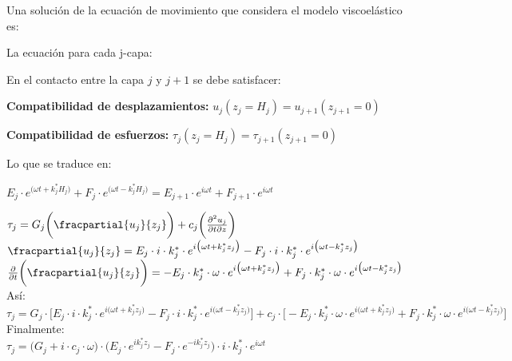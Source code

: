 

Una solución de la ecuación de movimiento que considera el modelo viscoelástico es:


La ecuación para cada j-capa:


En el contacto entre la capa $j$ y $j+1$ se debe satisfacer:

\begin{enumeratebf}
	\item \textbf{Compatibilidad de desplazamientos:} $u_j(z_j=H_j) = u_{j+1}(z_{j+1}=0)$
	\item \textbf{Compatibilidad de esfuerzos:} $\tau_j(z_j=H_j) = \tau_{j+1}(z_{j+1}=0)$
\end{enumeratebf}

Lo que se traduce en:

\begin{enumeratebf}
	\item $E_j\cdot e^{\big(\omega t + k_j^* H_j\big)} + F_j\cdot e^{\big(\omega t - k_j^* H_j\big)} = E_{j+1}\cdot e^{i\omega t} + F_{j+1}\cdot e^{i\omega t}$
	
	\item $\tau_j = G_j\bigg(\fracpartial{u_j}{z_j}\bigg)+c_j\bigg(\frac{\partial^2 u_j}{\partial t \partial z}\bigg)$ \\
	$\fracpartial{u_j}{z_j} = E_j \cdot i \cdot k_j^* \cdot e^{i\big(\omega t  + k_j^* z_j\big)} - F_j \cdot i \cdot k_j^* \cdot e^{i\big(\omega t - k_j^*z_j\big)}$ \\
	$\frac{\partial}{\partial t}\bigg(\fracpartial{u_j}{z_j}\bigg) = -E_j \cdot k_j^* \cdot \omega \cdot e^{i\big(\omega t + k_j^* z_j\big)}+F_j \cdot k_j^* \cdot \omega \cdot e^{i\big(\omega t - k_j^* z_j\big)}$ \\
	
	Así: \\
	$\tau_j = G_j \cdot \bigg[E_j \cdot i \cdot k_j^* \cdot e^{i\big(\omega t  + k_j^* z_j\big)} - F_j \cdot i \cdot k_j^* \cdot e^{i\big(\omega t - k_j^*z_j\big)}\bigg] + c_j \cdot \bigg[-E_j \cdot k_j^* \cdot \omega \cdot e^{i\big(\omega t + k_j^* z_j\big)}+F_j \cdot k_j^* \cdot \omega \cdot e^{i\big(\omega t - k_j^* z_j\big)}\bigg]$ \\
	
	Finalmente: \\
	$\tau_j = \big(G_j + i \cdot c_j \cdot \omega \big) \cdot \big(E_j \cdot e^{i k_j^* z_j}-F_j \cdot e^{-i k_j^* z_j}\big) \cdot i \cdot k_j^* \cdot e^{i\omega t}$
\end{enumeratebf}

